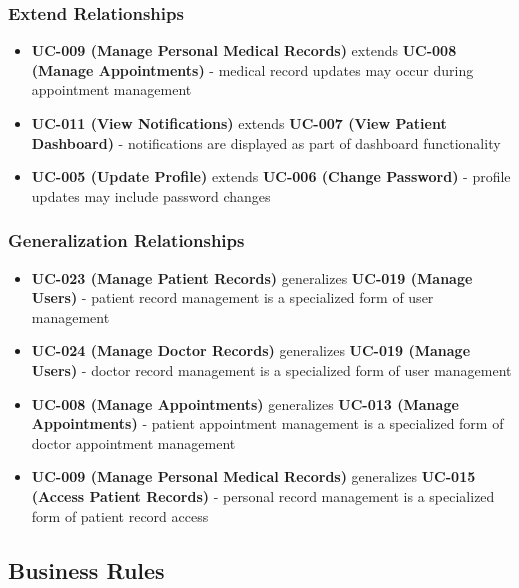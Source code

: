 \documentclass[12pt,a4paper]{article}
\begin{document}
\subsubsection{Extend Relationships}
\begin{itemize}
    \item \textbf{UC-009 (Manage Personal Medical Records)} extends \textbf{UC-008 (Manage Appointments)} - medical record updates may occur during appointment management
    \item \textbf{UC-011 (View Notifications)} extends \textbf{UC-007 (View Patient Dashboard)} - notifications are displayed as part of dashboard functionality
    \item \textbf{UC-005 (Update Profile)} extends \textbf{UC-006 (Change Password)} - profile updates may include password changes
\end{itemize}

\subsubsection{Generalization Relationships}
\begin{itemize}
    \item \textbf{UC-023 (Manage Patient Records)} generalizes \textbf{UC-019 (Manage Users)} - patient record management is a specialized form of user management
    \item \textbf{UC-024 (Manage Doctor Records)} generalizes \textbf{UC-019 (Manage Users)} - doctor record management is a specialized form of user management
    \item \textbf{UC-008 (Manage Appointments)} generalizes \textbf{UC-013 (Manage Appointments)} - patient appointment management is a specialized form of doctor appointment management
    \item \textbf{UC-009 (Manage Personal Medical Records)} generalizes \textbf{UC-015 (Access Patient Records)} - personal record management is a specialized form of patient record access
\end{itemize}

\subsection{Business Rules}
\end{document}
